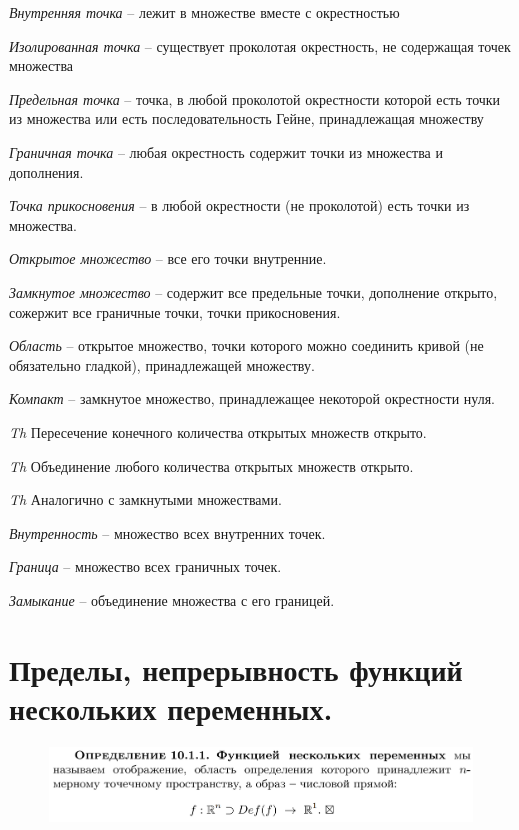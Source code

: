 \documentclass{article}
\newcommand{\ii}{\textit}
\begin{document}
\ii{Внутренняя точка} -- лежит в множестве вместе с окрестностью

\ii{Изолированная точка} -- существует проколотая окрестность, не содержащая точек множества

\ii{Предельная точка} -- точка, в любой проколотой окрестности которой есть точки из множества или есть последовательность Гейне, принадлежащая множеству

\ii{Граничная точка} -- любая окрестность содержит точки из множества и дополнения.

\ii{Точка прикосновения} -- в любой окрестности (не проколотой) есть точки из множества.

\ii{Открытое множество} -- все его точки внутренние.

\ii{Замкнутое множество} -- содержит все предельные точки, дополнение открыто, сожержит все граничные точки, точки прикосновения.

\ii{Область} -- открытое множество, точки которого можно соединить кривой (не обязательно гладкой), принадлежащей множеству.

\ii{Компакт} -- замкнутое множество, принадлежащее некоторой окрестности нуля.

\ii{Th} Пересечение конечного количества открытых множеств открыто.

\ii{Th} Объединение любого количества открытых множеств открыто.

\ii{Th} Аналогично с замкнутыми множествами.

\ii{Внутренность} -- множество всех внутренних точек.

\ii{Граница} -- множество всех граничных точек.

\ii{Замыкание} -- объединение множества с его границей.

\newpage\noindent
\section{Пределы, непрерывность функций нескольких переменных.}
\begin{figure}[h!]
    \centering
    \includegraphics[width=\textwidth]{14.png}
    \vspace{-1cm}
\end{figure}
\end{document}
